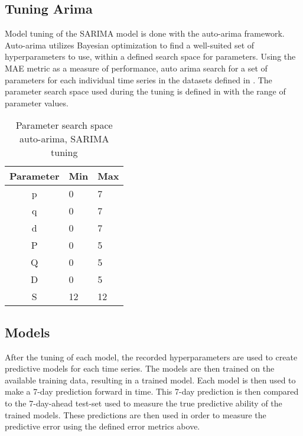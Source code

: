   \subsection{Tuning Arima}
  Model tuning of the SARIMA model is done with the auto-arima framework.
  Auto-arima utilizes Bayesian optimization to find a well-suited set of hyperparameters to use,
  within a defined search space for parameters.
  Using the MAE metric as a measure of performance, auto arima search for a set of parameters for each individual time series
  in the datasets defined in .
  The parameter search space used during the tuning is defined in  with the range of parameter values.

  \begin{table}[h]
    \centering
    \caption{Parameter search space auto-arima, SARIMA tuning}
    \label{table:method:arima-tuning}
    \begin{tabular}{|c|l|l|}\hline
      Parameter & Min & Max \\ \hline
      p         & 0   & 7   \\ \hline
      q         & 0   & 7   \\ \hline
      d         & 0   & 7   \\ \hline
      P         & 0   & 5   \\ \hline
      Q         & 0   & 5   \\ \hline
      D         & 0   & 5   \\ \hline
      S         & 12  & 12  \\ \hline
    \end{tabular}
  \end{table}


  \subsection{Models}

  After the tuning of each model, the recorded hyperparameters are used to create predictive models for each time series.
  The models are then trained on the available training data, resulting in a trained model.
  Each model is then used to make a 7-day prediction forward in time.
  This 7-day prediction is then compared to the 7-day-ahead test-set used to measure the true predictive ability of the trained models.
  These predictions are then used in order to measure the predictive error using the defined error metrics above.



